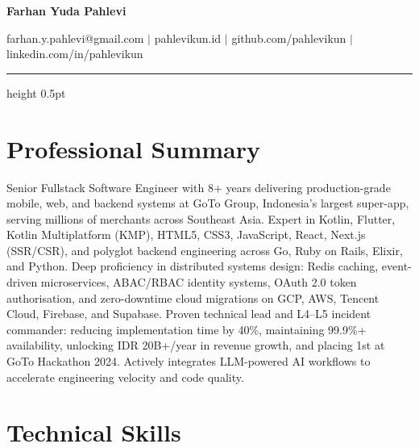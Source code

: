 \documentclass[10pt]{article}
\begin{document}
{\LARGE \textbf{Farhan Yuda Pahlevi}}

\smallskip
farhan.y.pahlevi@gmail.com $|$ pahlevikun.id $|$ github.com/pahlevikun $|$ linkedin.com/in/pahlevikun

\vspace{2pt}\hrule height 0.5pt\vspace{3pt}

\section*{Professional Summary}
Senior Fullstack Software Engineer with 8+ years delivering production-grade mobile, web, and backend systems at GoTo Group, Indonesia's largest super-app, serving millions of merchants across Southeast Asia. Expert in Kotlin, Flutter, Kotlin Multiplatform (KMP), HTML5, CSS3, JavaScript, React, Next.js (SSR/CSR), and polyglot backend engineering across Go, Ruby on Rails, Elixir, and Python. Deep proficiency in distributed systems design: Redis caching, event-driven microservices, ABAC/RBAC identity systems, OAuth 2.0 token authorisation, and zero-downtime cloud migrations on GCP, AWS, Tencent Cloud, Firebase, and Supabase. Proven technical lead and L4--L5 incident commander: reducing implementation time by 40\%, maintaining 99.9\%+ availability, unlocking IDR 20B+/year in revenue growth, and placing 1st at GoTo Hackathon 2024. Actively integrates LLM-powered AI workflows to accelerate engineering velocity and code quality.

\section*{Technical Skills}
\end{document}
